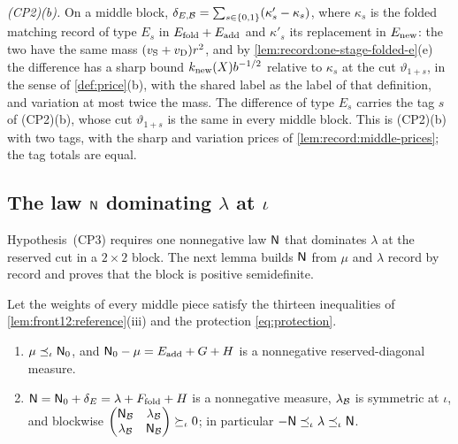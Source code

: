 \emph{(CP2)(b).} On a middle block, $\delta_{E,\mathcal B}=\sum_{s\in\{0,1\}}
(\kappa'_s-\kappa_s)$, where $\kappa_s$ is the folded matching record of type
$E_s$ in $E_{\rm fold}+E_{\rm add}$ and $\kappa'_s$ its replacement in $E_{\rm new}$:
the two have the same mass $(v_{\rm S}+v_{\rm D})r^2$, and by
\cref{lem:record:one-stage-folded-e}(e) the difference has a sharp bound
$k_{\rm new}(X)b^{-1/2}$ relative to $\kappa_s$ at the cut $\vartheta_{1+s}$,
in the sense of \cref{def:price}(b), with the shared label as the label of
that definition, and variation at most twice the mass. The difference of type
$E_s$ carries the tag $s$ of (CP2)(b), whose cut $\vartheta_{1+s}$ is the same
in every middle block. This is (CP2)(b) with two tags, with the sharp and
variation prices of \cref{lem:record:middle-prices}; the tag totals are
equal.

\subsection{The law \texorpdfstring{$\mathsf N$}{N} dominating \texorpdfstring{$\lambda$}{lambda} at \texorpdfstring{$\iota$}{iota}}\label{subsec:middle-gram}

Hypothesis~(CP3) requires one nonnegative law $\mathsf N$ that dominates
$\lambda$ at the reserved cut in a $2\times2$ block. The next lemma
builds $\mathsf N$ from $\mu$ and $\lambda$ record by record and proves
that the block is positive semidefinite.

\begin{lemma}\label{lem:record:gram}
Let the weights of every middle piece satisfy the thirteen inequalities of
\cref{lem:front12:reference}(iii) and the protection \eqref{eq:protection}.
\begin{enumerate}[label=(\roman*)]
\item $\mu\preceq_\iota\mathsf N_0$, and $\mathsf N_0-\mu=E_{\rm add}+G+H$ is a
 nonnegative reserved-diagonal measure.
\item $\mathsf N=\mathsf N_0+\delta_E=\lambda+F_{\rm fold}+H$ is a nonnegative measure,
 $\lambda_{\mathcal B}$ is symmetric at $\iota$, and blockwise
 $\begin{pmatrix}\mathsf N_{\mathcal B}&\lambda_{\mathcal B}\\ \lambda_{\mathcal B}&\mathsf N_{\mathcal B}\end{pmatrix}
 \succeq_\iota0$; in particular $-\mathsf N\preceq_\iota\lambda\preceq_\iota\mathsf N$.
\end{enumerate}
\end{lemma}

